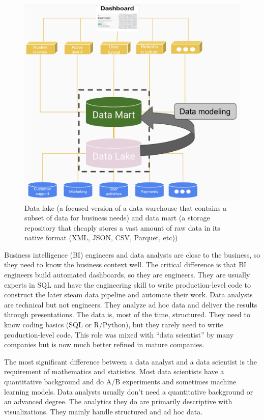 \documentclass[
  12pt,
]{krantz}
\begin{document}
\begin{figure}

{\centering \includegraphics[width=1\linewidth]{images/databases} 

}

\caption{Data lake (a focused version of a data warehouse that contains a subset of data for business needs) and data mart (a storage repository that cheaply stores a vast amount of raw data in its native format (XML, JSON, CSV, Parquet, etc))}\label{fig:databases}
\end{figure}

Business intelligence (BI) engineers and data analysts are close to the business, so they need to know the business context well. The critical difference is that BI engineers build automated dashboards, so they are engineers. They are usually experts in SQL and have the engineering skill to write production-level code to construct the later steam data pipeline and automate their work. Data analysts are technical but not engineers. They analyze ad hoc data and deliver the results through presentations. The data is, most of the time, structured. They need to know coding basics (SQL or R/Python), but they rarely need to write production-level code. This role was mixed with ``data scientist'' by many companies but is now much better refined in mature companies.

The most significant difference between a data analyst and a data scientist is the requirement of mathematics and statistics. Most data scientists have a quantitative background and do A/B experiments and sometimes machine learning models. Data analysts usually don't need a quantitative background or an advanced degree. The analytics they do are primarily descriptive with visualizations. They mainly handle structured and ad hoc data.
\end{document}
